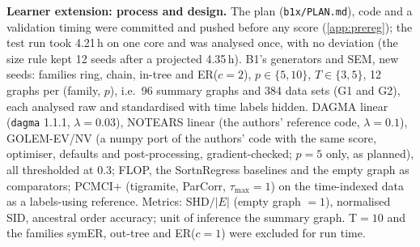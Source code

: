 \textbf{Learner extension: process and design.} The plan (\texttt{b1x/PLAN.md}),
code and a validation timing were committed and pushed before any score
(\cref{app:prereg}); the test run took 4.21\,h on one core and was analysed
once, with no deviation (the size rule kept 12 seeds after a projected 4.35\,h).
B1's generators and SEM, new seeds: families ring, chain, in-tree and
ER($c{=}2$), $p\in\{5,10\}$, $T\in\{3,5\}$, 12 graphs per (family, $p$), i.e.\ 96
summary graphs and 384 data sets (G1 and G2), each analysed raw and
standardised with time labels hidden. DAGMA linear (\texttt{dagma} 1.1.1,
$\lambda=0.03$), NOTEARS linear (the authors' reference code, $\lambda=0.1$),
GOLEM-EV/NV (a numpy port of the authors' code with the same score, optimiser,
defaults and post-processing, gradient-checked; $p=5$ only, as planned), all
thresholded at $0.3$; FLOP, the SortnRegress baselines and the empty graph as
comparators; PCMCI+ (tigramite, ParCorr, $\tau_{\max}=1$) on the time-indexed
data as a labels-using reference. Metrics: SHD$/|E|$ (empty graph $=1$),
normalised SID, ancestral order accuracy; unit of inference the summary graph.
T$=10$ and the families symER, out-tree and ER($c{=}1$) were excluded for run time.

